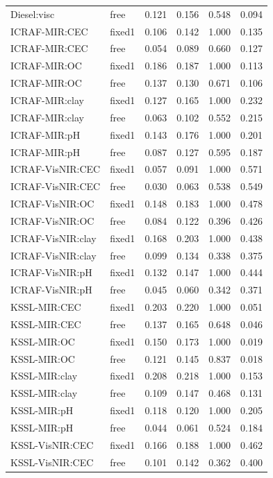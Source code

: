 \begin{tabular}{llllll}
Diesel:visc & free & 0.121 & 0.156 & 0.548 & 0.094 \\
ICRAF-MIR:CEC & fixed1 & 0.106 & 0.142 & 1.000 & 0.135 \\
ICRAF-MIR:CEC & free & 0.054 & 0.089 & 0.660 & 0.127 \\
ICRAF-MIR:OC & fixed1 & 0.186 & 0.187 & 1.000 & 0.113 \\
ICRAF-MIR:OC & free & 0.137 & 0.130 & 0.671 & 0.106 \\
ICRAF-MIR:clay & fixed1 & 0.127 & 0.165 & 1.000 & 0.232 \\
ICRAF-MIR:clay & free & 0.063 & 0.102 & 0.552 & 0.215 \\
ICRAF-MIR:pH & fixed1 & 0.143 & 0.176 & 1.000 & 0.201 \\
ICRAF-MIR:pH & free & 0.087 & 0.127 & 0.595 & 0.187 \\
ICRAF-VisNIR:CEC & fixed1 & 0.057 & 0.091 & 1.000 & 0.571 \\
ICRAF-VisNIR:CEC & free & 0.030 & 0.063 & 0.538 & 0.549 \\
ICRAF-VisNIR:OC & fixed1 & 0.148 & 0.183 & 1.000 & 0.478 \\
ICRAF-VisNIR:OC & free & 0.084 & 0.122 & 0.396 & 0.426 \\
ICRAF-VisNIR:clay & fixed1 & 0.168 & 0.203 & 1.000 & 0.438 \\
ICRAF-VisNIR:clay & free & 0.099 & 0.134 & 0.338 & 0.375 \\
ICRAF-VisNIR:pH & fixed1 & 0.132 & 0.147 & 1.000 & 0.444 \\
ICRAF-VisNIR:pH & free & 0.045 & 0.060 & 0.342 & 0.371 \\
KSSL-MIR:CEC & fixed1 & 0.203 & 0.220 & 1.000 & 0.051 \\
KSSL-MIR:CEC & free & 0.137 & 0.165 & 0.648 & 0.046 \\
KSSL-MIR:OC & fixed1 & 0.150 & 0.173 & 1.000 & 0.019 \\
KSSL-MIR:OC & free & 0.121 & 0.145 & 0.837 & 0.018 \\
KSSL-MIR:clay & fixed1 & 0.208 & 0.218 & 1.000 & 0.153 \\
KSSL-MIR:clay & free & 0.109 & 0.147 & 0.468 & 0.131 \\
KSSL-MIR:pH & fixed1 & 0.118 & 0.120 & 1.000 & 0.205 \\
KSSL-MIR:pH & free & 0.044 & 0.061 & 0.524 & 0.184 \\
KSSL-VisNIR:CEC & fixed1 & 0.166 & 0.188 & 1.000 & 0.462 \\
KSSL-VisNIR:CEC & free & 0.101 & 0.142 & 0.362 & 0.400 \\

\end{tabular}
